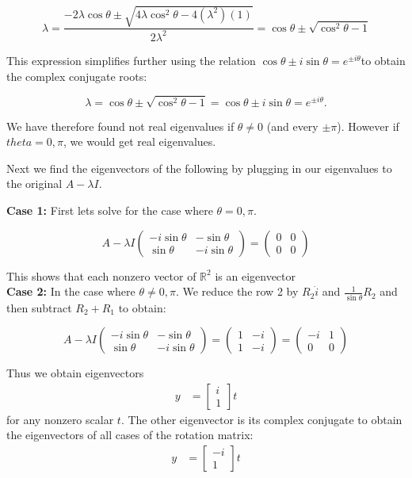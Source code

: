 \documentclass[8pt]{article}
\begin{document}
$$
\lambda = \frac{-2 \lambda \cos \theta \pm \sqrt{4 \lambda \cos ^{2} \theta - 4(\lambda ^{2})(1)}}{2 \lambda ^{2}} = \cos \theta \pm \sqrt{\cos ^{2} \theta -1 } 
$$

This expression simplifies further using the relation $\cos \theta \pm i \sin \theta = e^{\pm i \theta}$to obtain the complex conjugate roots:

$$
\lambda = \cos \theta \pm \sqrt{\cos ^{2} \theta -1 } = \cos \theta \pm i \sin \theta = e^{\pm i \theta}.
$$

We have therefore found not real eigenvalues if $\theta \neq 0$ (and every $\pm \pi$). However if $theta = 0, \pi$, we would get real eigenvalues.

Next we find the eigenvectors of the following by plugging in our eigenvalues to the original $A- \lambda I$.

\textbf{Case 1:} First lets solve for the case where $\theta = 0, \pi$.

$$
A - \lambda I
\begin{pmatrix}
 -i \sin \theta & -\sin \theta \\
\sin \theta & -i \sin \theta 
\end{pmatrix} = 
\begin{pmatrix}
 0 & 0 \\
0 & 0 
\end{pmatrix} 
$$

This shows that each nonzero vector of $\mathbb{R}^{2}$ is an eigenvector \\

\textbf{Case 2:} In the case where $ \theta \neq 0, \pi$. We reduce the row 2 by $R_2 \dot i$ and $\frac{1}{\sin \theta} R_2$ and then subtract $R_2 + R_1$ to obtain: 

$$
A - \lambda I
\begin{pmatrix}
 -i \sin \theta & -\sin \theta \\
\sin \theta & -i \sin \theta 
\end{pmatrix} = 
\begin{pmatrix}
 1 & -i \\
1 & -i 
\end{pmatrix} =
\begin{pmatrix}
 -i & 1 \\
0 & 0 
\end{pmatrix}
$$

Thus we obtain eigenvectors   
\begin{align}
    y &= \begin{bmatrix}
           i \\
        1
         \end{bmatrix}t 
\end{align}
for any nonzero scalar $t$. The other eigenvector is its complex conjugate to obtain the eigenvectors of all cases of the rotation matrix: 
\begin{align}
    y &= \begin{bmatrix}
           -i \\
           1
         \end{bmatrix}t 
\end{align}
\end{document}
